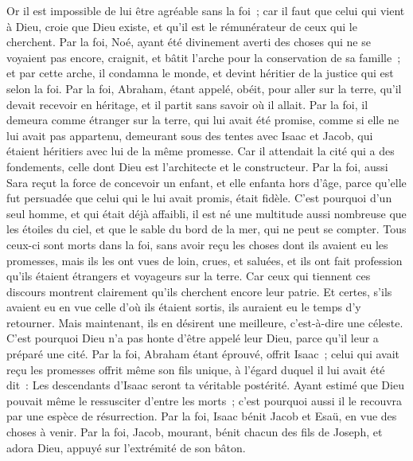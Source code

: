 \begin{multicols}{2}
Or il est impossible de lui être agréable sans la foi~; car il faut que celui qui vient à Dieu, croie que Dieu existe, et qu'il est le rémunérateur de ceux qui le cherchent.
Par la foi, Noé, ayant été divinement averti des choses qui ne se voyaient pas encore, craignit, et bâtit l'arche pour la conservation de sa famille~; et par cette arche, il condamna le monde, et devint héritier de la justice qui est selon la foi.
Par la foi, Abraham, étant appelé, obéit, pour aller sur la terre, qu'il devait recevoir en héritage, et il partit sans savoir où il allait.
Par la foi, il demeura comme étranger sur la terre, qui lui avait été promise, comme si elle ne lui avait pas appartenu, demeurant sous des tentes avec Isaac et Jacob, qui étaient héritiers avec lui de la même promesse.
Car il attendait la cité qui a des fondements, celle dont Dieu est l'architecte et le constructeur.
Par la foi, aussi Sara reçut la force de concevoir un enfant, et elle enfanta hors d'âge, parce qu'elle fut persuadée que celui qui le lui avait promis, était fidèle.
C'est pourquoi d'un seul homme, et qui était déjà affaibli, il est né une multitude aussi nombreuse que les étoiles du ciel, et que le sable du bord de la mer, qui ne peut se compter.
Tous ceux-ci sont morts dans la foi, sans avoir reçu les choses dont ils avaient eu les promesses, mais ils les ont vues de loin, crues, et saluées, et ils ont fait profession qu'ils étaient étrangers et voyageurs sur la terre.
Car ceux qui tiennent ces discours montrent clairement qu'ils cherchent encore leur patrie.
Et certes, s'ils avaient eu en vue celle d'où ils étaient sortis, ils auraient eu le temps d'y retourner.
Mais maintenant, ils en désirent une meilleure, c'est-à-dire une céleste. C'est pourquoi Dieu n'a pas honte d'être appelé leur Dieu, parce qu'il leur a préparé une cité.
Par la foi, Abraham étant éprouvé, offrit Isaac~; celui qui avait reçu les promesses offrit même son fils unique,
à l'égard duquel il lui avait été dit~: Les descendants d'Isaac seront ta véritable postérité.
Ayant estimé que Dieu pouvait même le ressusciter d'entre les morts~; c'est pourquoi aussi il le recouvra par une espèce de résurrection.
Par la foi, Isaac bénit Jacob et Esaü, en vue des choses à venir.
Par la foi, Jacob, mourant, bénit chacun des fils de Joseph, et adora Dieu, appuyé sur l'extrémité de son bâton.

\end{multicols}
